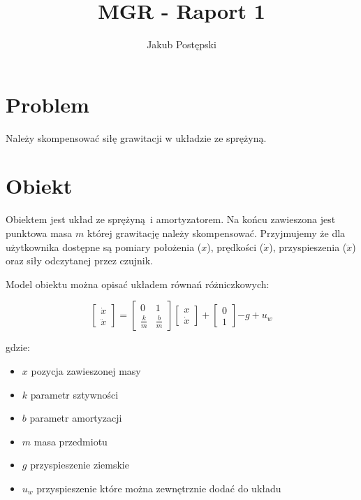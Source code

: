 \documentclass[a4paper]{article}
\title{MGR - Raport 1}
\author{Jakub Postępski}
\begin{document}
\maketitle

\section{Problem}
Należy skompensować siłę grawitacji w układzie ze sprężyną.

\section{Obiekt}
Obiektem jest układ ze sprężyną i amortyzatorem. Na końcu zawieszona jest punktowa masa $m$ której grawitację należy skompensować. Przyjmujemy że dla użytkownika dostępne są pomiary położenia ($x$), prędkości ($\dot{x}$), przyspieszenia ($\ddot{x}$) oraz siły odczytanej przez czujnik.

Model obiektu można opisać układem równań różniczkowych:

\begin{equation}
	\begin{bmatrix}
	    \dot{x} \\
	    \ddot{x}
	\end{bmatrix}
	=
	\begin{bmatrix}
	    0 & 1 \\
	    \frac{k}{m} & \frac{b}{m}
	\end{bmatrix}
	\begin{bmatrix}
		x \\
	    \dot{x}
	\end{bmatrix}
	+
	\begin{bmatrix}
	    0 \\
	    1
	\end{bmatrix}
	{-g + u_w}
\end{equation}

gdzie:
\begin{itemize}
	\item $x$ pozycja zawieszonej masy
	\item $k$ parametr sztywności
	\item $b$ parametr amortyzacji
	\item $m$ masa przedmiotu
	\item $g$ przyspieszenie ziemskie
	\item $u_w$ przyspieszenie które można zewnętrznie dodać do układu
\end{itemize}
\end{document}
